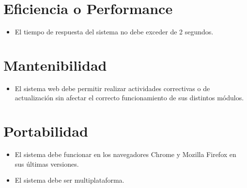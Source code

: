 \section{Eficiencia o Performance} 
\begin{itemize}
\item El tiempo de respuesta del sistema no debe exceder de 2 segundos.
\end{itemize}
\section{Mantenibilidad} 
\begin{itemize}
\item El sistema web debe permitir realizar actividades correctivas o de actualización sin afectar el correcto funcionamiento de sus distintos módulos.
\end{itemize}
\section{Portabilidad} 
\begin{itemize}
\item El sistema debe funcionar en los navegadores Chrome y Mozilla Firefox en sus últimas versiones.
\item El sistema debe ser multiplataforma.
\end{itemize}

